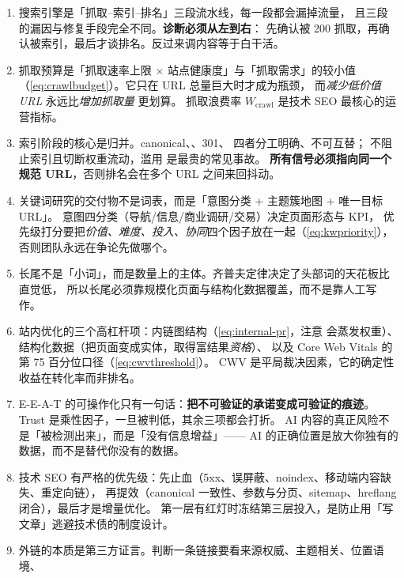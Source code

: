 \begin{keypoint}[本章要点回顾]
\begin{enumerate}
  \item 搜索引擎是「抓取--索引--排名」三段流水线，每一段都会漏掉流量，
        且三段的漏因与修复手段完全不同。\textbf{诊断必须从左到右}：
        先确认被 200 抓取，再确认被索引，最后才谈排名。反过来调内容等于白干活。
  \item 抓取预算是「抓取速率上限 $\times$ 站点健康度」与「抓取需求」的较小值
        （\cref{eq:crawlbudget}）。它只在 URL 总量巨大时才成为瓶颈，
        而\emph{减少低价值 URL} 永远比\emph{增加抓取量} 更划算。
        抓取浪费率 $W_{\text{crawl}}$ 是技术 SEO 最核心的运营指标。
  \item 索引阶段的核心是归并。canonical、、301、 四者分工明确、不可互替；
         不阻止索引且切断权重流动，滥用  是最贵的常见事故。
        \textbf{所有信号必须指向同一个规范 URL}，否则排名会在多个 URL 之间来回抖动。
  \item 关键词研究的交付物不是词表，而是「意图分类 + 主题簇地图 + 唯一目标 URL」。
        意图四分类（导航/信息/商业调研/交易）决定页面形态与 KPI，
        优先级打分要把\emph{价值、难度、投入、协同}四个因子放在一起（\cref{eq:kwpriority}），
        否则团队永远在争论先做哪个。
  \item 长尾不是「小词」，而是数量上的主体。齐普夫定律决定了头部词的天花板比直觉低，
        所以长尾必须靠规模化页面与结构化数据覆盖，而不是靠人工写作。
  \item 站内优化的三个高杠杆项：内链图结构（\cref{eq:internal-pr}，注意  会蒸发权重）、
        结构化数据（把页面变成实体，取得富结果\emph{资格}）、
        以及 Core Web Vitals 的第 75 百分位口径（\cref{eq:cwvthreshold}）。
        CWV 是平局裁决因素，它的确定性收益在转化率而非排名。
  \item E-E-A-T 的可操作化只有一句话：\textbf{把不可验证的承诺变成可验证的痕迹}。
        Trust 是乘性因子，一旦被判低，其余三项都会打折。
        AI 内容的真正风险不是「被检测出来」，而是「没有信息增益」——
        AI 的正确位置是放大你独有的数据，而不是替代你没有的数据。
  \item 技术 SEO 有严格的优先级：先止血（5xx、误屏蔽、noindex、移动端内容缺失、重定向链），
        再提效（canonical 一致性、参数与分页、sitemap、hreflang 闭合），最后才是增量优化。
        第一层有红灯时冻结第三层投入，是防止用「写文章」逃避技术债的制度设计。
  \item 外链的本质是第三方证言。判断一条链接要看来源权威、主题相关、位置语境、

\end{enumerate}
\end{keypoint}
